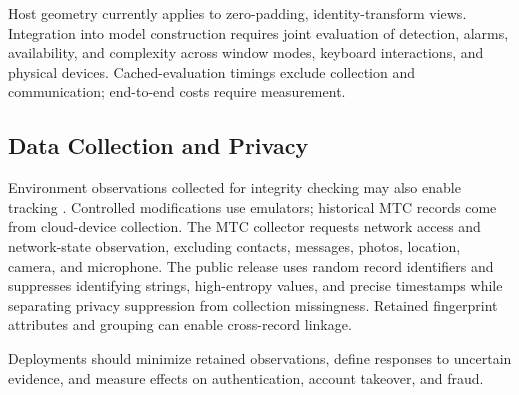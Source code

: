 Host geometry currently applies to zero-padding, identity-transform views. Integration into model construction requires joint evaluation of detection, alarms, availability, and complexity across window modes, keyboard interactions, and physical devices. Cached-evaluation timings exclude collection and communication; end-to-end costs require measurement.

\hypertarget{sec:6-4}{%
\subsection{Data Collection and Privacy}\label{sec:6-4}}

Environment observations collected for integrity checking may also enable tracking \cite{ref09,ref12,ref18}. Controlled modifications use emulators; historical MTC records come from cloud-device collection. The MTC collector requests network access and network-state observation, excluding contacts, messages, photos, location, camera, and microphone. The public release uses random record identifiers and suppresses identifying strings, high-entropy values, and precise timestamps while separating privacy suppression from collection missingness. Retained fingerprint attributes and grouping can enable cross-record linkage.

Deployments should minimize retained observations, define responses to uncertain evidence, and measure effects on authentication, account takeover, and fraud.
